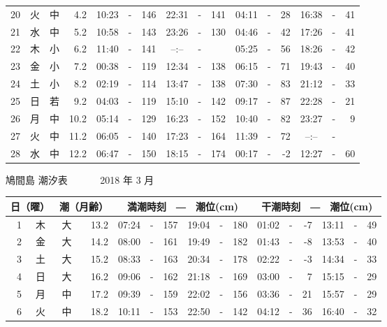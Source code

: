 \documentclass[12pt.a4j]{jsarticle}
\begin{document}
\begin{center}
\begin{table}[ht]
\begin{tabular}{|rc|cr|ccrccr|ccrccr|}
20 & 火 & 中 &  4.2 &  10:23 &-& 146  &  22:31 &-& 141  &   04:11 &-&  28  &   16:38 &-&  41  \\
21 & 水 & 中 &  5.2 &  10:58 &-& 143  &  23:26 &-& 130  &   04:46 &-&  42  &   17:26 &-&  41  \\
22 & 木 & 小 &  6.2 &  11:40 &-& 141  &  --:-- &-&     &   05:25 &-&  56  &   18:26 &-&  42  \\
23 & 金 & 小 &  7.2 &  00:38 &-& 119  &  12:34 &-& 138  &   06:15 &-&  71  &   19:43 &-&  40  \\
24 & 土 & 小 &  8.2 &  02:19 &-& 114  &  13:47 &-& 138  &   07:30 &-&  83  &   21:12 &-&  33  \\
25 & 日 & 若 &  9.2 &  04:03 &-& 119  &  15:10 &-& 142  &   09:17 &-&  87  &   22:28 &-&  21  \\
26 & 月 & 中 & 10.2 &  05:14 &-& 129  &  16:23 &-& 152  &   10:40 &-&  82  &   23:27 &-&   9  \\
27 & 火 & 中 & 11.2 &  06:05 &-& 140  &  17:23 &-& 164  &   11:39 &-&  72  &   --:-- &-&     \\
28 & 水 & 中 & 12.2 &  06:47 &-& 150  &  18:15 &-& 174  &   00:17 &-&  -2  &   12:27 &-&  60  \\
   \hline
   \end{tabular}
\end{table}
\newpage
 {\LARGE 鳩間島  潮汐表　　　}
 {\large 2018 年  3 月}\\
 \begin{table}[ht]
    \begin{tabular}{|rc|cr|ccrccr|ccrccr|}
    \hline
    \multicolumn{2}{|c|}{日（曜）} & \multicolumn{2}{c|}{潮（月齢）} & \multicolumn{6}{c|}{満潮時刻　―　潮位(cm)} & \multicolumn{6}{c|}{干潮時刻　―　潮位(cm)} \\
 \hline
 1 & 木 & 大 & 13.2 &  07:24 &-& 157  &  19:04 &-& 180  &   01:02 &-&  -7  &   13:11 &-&  49  \\
 2 & 金 & 大 & 14.2 &  08:00 &-& 161  &  19:49 &-& 182  &   01:43 &-&  -8  &   13:53 &-&  40  \\
 3 & 土 & 大 & 15.2 &  08:33 &-& 163  &  20:34 &-& 178  &   02:22 &-&  -3  &   14:34 &-&  33  \\
 4 & 日 & 大 & 16.2 &  09:06 &-& 162  &  21:18 &-& 169  &   03:00 &-&   7  &   15:15 &-&  29  \\
 5 & 月 & 中 & 17.2 &  09:39 &-& 159  &  22:02 &-& 156  &   03:36 &-&  21  &   15:57 &-&  29  \\
 6 & 火 & 中 & 18.2 &  10:11 &-& 153  &  22:50 &-& 142  &   04:12 &-&  36  &   16:40 &-&  32  \\

\end{tabular}
\end{table}
\end{center}
\end{document}
